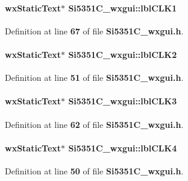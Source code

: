 \paragraph[{lbl\+C\+L\+K1}]{\setlength{\rightskip}{0pt plus 5cm}wx\+Static\+Text$\ast$ Si5351\+C\+\_\+wxgui\+::lbl\+C\+L\+K1}\label{classSi5351C__wxgui_a0c90dab72f3058c2a562c2fb3f810fa0}


Definition at line {\bf 67} of file {\bf Si5351\+C\+\_\+wxgui.\+h}.

\paragraph[{lbl\+C\+L\+K2}]{\setlength{\rightskip}{0pt plus 5cm}wx\+Static\+Text$\ast$ Si5351\+C\+\_\+wxgui\+::lbl\+C\+L\+K2}\label{classSi5351C__wxgui_a5d0f42e91d73709b57af0f22ec09cfeb}


Definition at line {\bf 51} of file {\bf Si5351\+C\+\_\+wxgui.\+h}.

\paragraph[{lbl\+C\+L\+K3}]{\setlength{\rightskip}{0pt plus 5cm}wx\+Static\+Text$\ast$ Si5351\+C\+\_\+wxgui\+::lbl\+C\+L\+K3}\label{classSi5351C__wxgui_adeb66387fe6ee7b609632c843b7717f9}


Definition at line {\bf 62} of file {\bf Si5351\+C\+\_\+wxgui.\+h}.

\paragraph[{lbl\+C\+L\+K4}]{\setlength{\rightskip}{0pt plus 5cm}wx\+Static\+Text$\ast$ Si5351\+C\+\_\+wxgui\+::lbl\+C\+L\+K4}\label{classSi5351C__wxgui_aa57067bb2b6e2b330da240c3cca59391}


Definition at line {\bf 50} of file {\bf Si5351\+C\+\_\+wxgui.\+h}.

